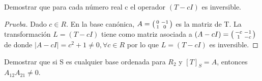 \documentclass[12pt]{article}
\newenvironment{problem}[2][Problem]{\begin{trivlist}
\item[\hskip \labelsep {\bfseries #1}\hskip \labelsep {\bfseries #2.}]}{\end{trivlist}}
\newenvironment{xmat}
  {\left(\begin{smallmatrix}}
  {\end{smallmatrix}\right)}
\begin{document}
\begin{problem}{4.3}
Demostrar que para cada número real c el operador $(T - cI)$  es inversible.
\end{problem}

\begin{proof} [Prueba]
Dado $c \in R$. En la base canónica, $A=\begin{xmat}0 & -1\\1 & 0\end{xmat}$ es la matriz de T. La transformación $L=(T-cI)$ tiene como matriz asociada a $(A-cI)=\begin{xmat}-c & -1\\1 & -c\end{xmat}$ de donde $|A-cI|=c^{2}+1 \neq 0, \forall c \in R$ por lo que $L=(T-cI)$ es inversible.
\end{proof} 

\begin{problem}{4.4}
Demostrar que si S es cualquier base ordenada para $R_{2}$ y $[T]_{S} = A$, entonces $A_{12}A_{21} \neq 0$.
\end{problem}
\end{document}
